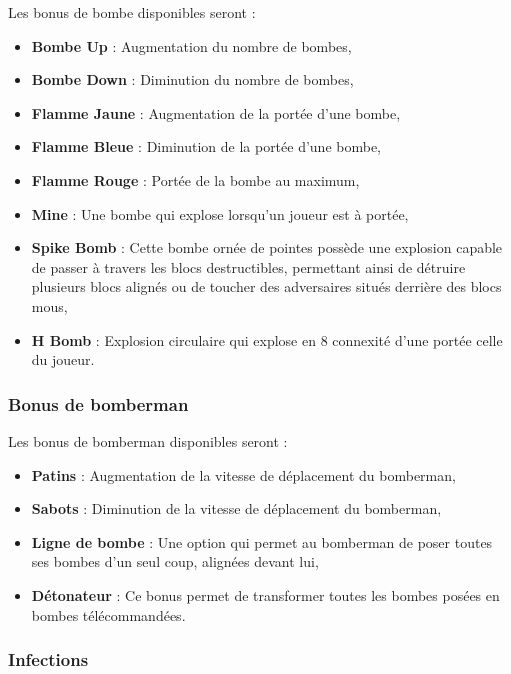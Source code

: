 Les bonus de bombe disponibles seront :
\begin{itemize}
\item \textbf{Bombe Up} : Augmentation du nombre de bombes,
\item \textbf{Bombe Down} : Diminution du nombre de bombes,
\item \textbf{Flamme Jaune} : Augmentation de la portée d'une bombe,
\item \textbf{Flamme Bleue} : Diminution de la portée d'une bombe,
\item \textbf{Flamme Rouge} : Portée de la bombe au maximum,
\item \textbf{Mine} : Une bombe qui explose lorsqu'un joueur est à portée,
\item \textbf{Spike Bomb} : Cette bombe ornée de pointes possède une explosion capable de passer à travers les blocs destructibles, permettant ainsi de détruire plusieurs blocs alignés ou de toucher des adversaires situés derrière des blocs mous,
\item \textbf{H Bomb} : Explosion circulaire qui explose en 8 connexité d'une portée celle du joueur.
\end{itemize}

\subsubsection{Bonus de bomberman}

Les bonus de bomberman disponibles seront :
\begin{itemize}
\item \textbf{Patins} : Augmentation de la vitesse de déplacement du bomberman,
\item \textbf{Sabots} : Diminution de la vitesse de déplacement du bomberman,
\item \textbf{Ligne de bombe} : Une option qui permet au bomberman de poser toutes ses bombes d'un seul coup, alignées devant lui,
\item \textbf{Détonateur} : Ce bonus permet de transformer toutes les bombes posées en bombes télécommandées.
\end{itemize}

\subsubsection{Infections}

